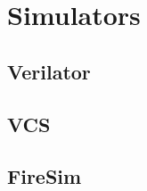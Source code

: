 \chapter{Simulators}\label{chap:Simulators}

\section{Verilator}\label{sec:Verilator_Simulator}

\section{VCS}\label{sec:VCS_Simulator}

\section{FireSim}\label{sec:FireSim_Simulator}

